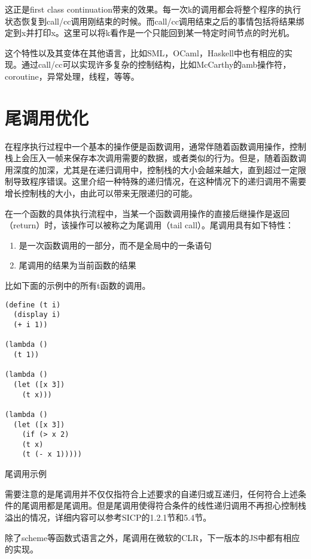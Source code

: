 这正是first class continuation带来的效果。每一次k的调用都会将整个程序的执行状态恢复到call/cc调用刚结束的时候。而call/cc调用结束之后的事情包括将结果绑定到x并打印x。这里可以将k看作是一个只能回到某一特定时间节点的时光机。

这个特性以及其变体在其他语言，比如SML，OCaml，Haskell中也有相应的实现。通过call/cc可以实现许多复杂的控制结构，比如McCarthy的amb操作符\cite{mccarthy61}，coroutine，异常处理，线程，等等。

\section{尾调用优化}

在程序执行过程中一个基本的操作便是函数调用，通常伴随着函数调用操作，控制栈上会压入一帧来保存本次调用需要的数据，或者类似的行为。但是，随着函数调用深度的加深，尤其是在递归调用中，控制栈的大小会越来越大，直到超过一定限制导致程序错误。这里介绍一种特殊的递归情况，在这种情况下的递归调用不需要增长控制栈的大小，由此可以带来无限递归的可能。

在一个函数的具体执行流程中，当某一个函数调用操作的直接后继操作是返回（return）时，该操作可以被称之为尾调用（tail call）。尾调用具有如下特性：

\begin{enumerate}[1.]
\item 是一次函数调用的一部分，而不是全局中的一条语句
\item 尾调用的结果为当前函数的结果
\end{enumerate}

比如下面的示例中的所有t函数的调用。

\begin{code}
\begin{verbatim}
(define (t i)
  (display i)
  (+ i 1))

(lambda ()
  (t 1))

(lambda ()
  (let ([x 3])
    (t x)))

(lambda ()
  (let ([x 3])
    (if (> x 2)
	(t x)
	(t (- x 1)))))
\end{verbatim}
\caption{尾调用示例}
\end{code}

需要注意的是尾调用并不仅仅指符合上述要求的自递归或互递归，任何符合上述条件的尾调用都是尾调用。但是尾调用使得符合条件的线性递归调用不再担心控制栈溢出的情况，详细内容可以参考SICP\cite{sicp}的1.2.1节和5.4节。

除了scheme等函数式语言之外，尾调用在微软的CLR，下一版本的JS中都有相应的实现。